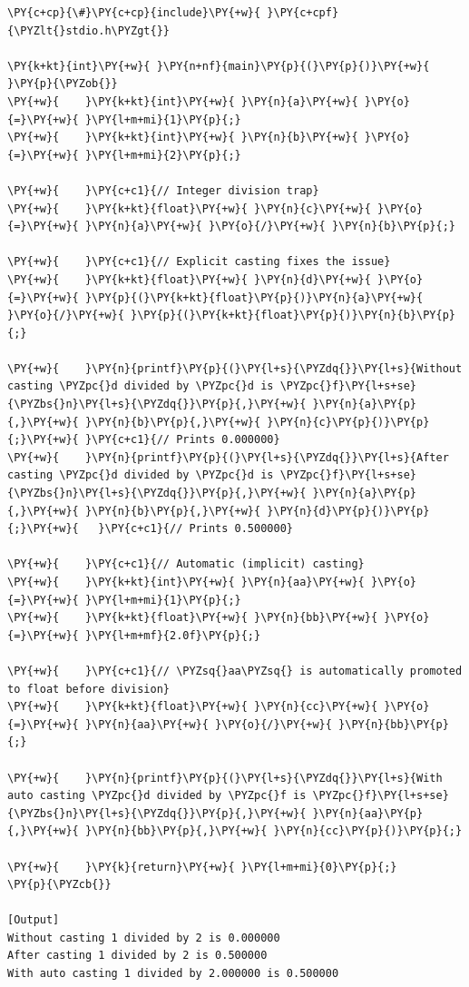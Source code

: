 \begin{Verbatim}[label=\makebox{\url{https://github.com/lucabaldini/cmepda/tree/master/slides/latex/snippets/casting.c}},commandchars=\\\{\}]
\PY{c+cp}{\#}\PY{c+cp}{include}\PY{+w}{ }\PY{c+cpf}{\PYZlt{}stdio.h\PYZgt{}}

\PY{k+kt}{int}\PY{+w}{ }\PY{n+nf}{main}\PY{p}{(}\PY{p}{)}\PY{+w}{ }\PY{p}{\PYZob{}}
\PY{+w}{    }\PY{k+kt}{int}\PY{+w}{ }\PY{n}{a}\PY{+w}{ }\PY{o}{=}\PY{+w}{ }\PY{l+m+mi}{1}\PY{p}{;}
\PY{+w}{    }\PY{k+kt}{int}\PY{+w}{ }\PY{n}{b}\PY{+w}{ }\PY{o}{=}\PY{+w}{ }\PY{l+m+mi}{2}\PY{p}{;}

\PY{+w}{    }\PY{c+c1}{// Integer division trap}
\PY{+w}{    }\PY{k+kt}{float}\PY{+w}{ }\PY{n}{c}\PY{+w}{ }\PY{o}{=}\PY{+w}{ }\PY{n}{a}\PY{+w}{ }\PY{o}{/}\PY{+w}{ }\PY{n}{b}\PY{p}{;}

\PY{+w}{    }\PY{c+c1}{// Explicit casting fixes the issue}
\PY{+w}{    }\PY{k+kt}{float}\PY{+w}{ }\PY{n}{d}\PY{+w}{ }\PY{o}{=}\PY{+w}{ }\PY{p}{(}\PY{k+kt}{float}\PY{p}{)}\PY{n}{a}\PY{+w}{ }\PY{o}{/}\PY{+w}{ }\PY{p}{(}\PY{k+kt}{float}\PY{p}{)}\PY{n}{b}\PY{p}{;}

\PY{+w}{    }\PY{n}{printf}\PY{p}{(}\PY{l+s}{\PYZdq{}}\PY{l+s}{Without casting \PYZpc{}d divided by \PYZpc{}d is \PYZpc{}f}\PY{l+s+se}{\PYZbs{}n}\PY{l+s}{\PYZdq{}}\PY{p}{,}\PY{+w}{ }\PY{n}{a}\PY{p}{,}\PY{+w}{ }\PY{n}{b}\PY{p}{,}\PY{+w}{ }\PY{n}{c}\PY{p}{)}\PY{p}{;}\PY{+w}{ }\PY{c+c1}{// Prints 0.000000}
\PY{+w}{    }\PY{n}{printf}\PY{p}{(}\PY{l+s}{\PYZdq{}}\PY{l+s}{After casting \PYZpc{}d divided by \PYZpc{}d is \PYZpc{}f}\PY{l+s+se}{\PYZbs{}n}\PY{l+s}{\PYZdq{}}\PY{p}{,}\PY{+w}{ }\PY{n}{a}\PY{p}{,}\PY{+w}{ }\PY{n}{b}\PY{p}{,}\PY{+w}{ }\PY{n}{d}\PY{p}{)}\PY{p}{;}\PY{+w}{   }\PY{c+c1}{// Prints 0.500000}

\PY{+w}{    }\PY{c+c1}{// Automatic (implicit) casting}
\PY{+w}{    }\PY{k+kt}{int}\PY{+w}{ }\PY{n}{aa}\PY{+w}{ }\PY{o}{=}\PY{+w}{ }\PY{l+m+mi}{1}\PY{p}{;}
\PY{+w}{    }\PY{k+kt}{float}\PY{+w}{ }\PY{n}{bb}\PY{+w}{ }\PY{o}{=}\PY{+w}{ }\PY{l+m+mf}{2.0f}\PY{p}{;}

\PY{+w}{    }\PY{c+c1}{// \PYZsq{}aa\PYZsq{} is automatically promoted to float before division}
\PY{+w}{    }\PY{k+kt}{float}\PY{+w}{ }\PY{n}{cc}\PY{+w}{ }\PY{o}{=}\PY{+w}{ }\PY{n}{aa}\PY{+w}{ }\PY{o}{/}\PY{+w}{ }\PY{n}{bb}\PY{p}{;}

\PY{+w}{    }\PY{n}{printf}\PY{p}{(}\PY{l+s}{\PYZdq{}}\PY{l+s}{With auto casting \PYZpc{}d divided by \PYZpc{}f is \PYZpc{}f}\PY{l+s+se}{\PYZbs{}n}\PY{l+s}{\PYZdq{}}\PY{p}{,}\PY{+w}{ }\PY{n}{aa}\PY{p}{,}\PY{+w}{ }\PY{n}{bb}\PY{p}{,}\PY{+w}{ }\PY{n}{cc}\PY{p}{)}\PY{p}{;}

\PY{+w}{    }\PY{k}{return}\PY{+w}{ }\PY{l+m+mi}{0}\PY{p}{;}
\PY{p}{\PYZcb{}}

[Output]
Without casting 1 divided by 2 is 0.000000
After casting 1 divided by 2 is 0.500000
With auto casting 1 divided by 2.000000 is 0.500000
\end{Verbatim}